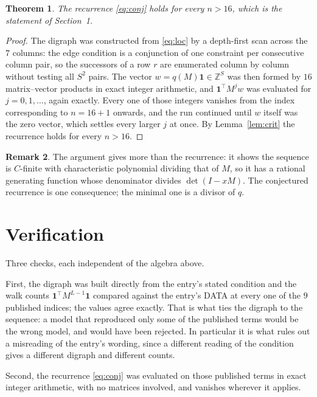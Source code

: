 \documentclass[11pt,a4paper]{article}
\theoremstyle{plain}
\newtheorem{theorem}{Theorem}
\theoremstyle{definition}
\newtheorem{remark}[theorem]{Remark}
\begin{document}
\begin{theorem}
The recurrence \eqref{eq:conj} holds for every $n>16$, which is the statement of
Section~1.
\end{theorem}

\begin{proof}
The digraph was constructed from \eqref{eq:loc} by a depth-first scan across the $7$
columns: the edge condition is a conjunction of one constraint per consecutive column
pair, so the successors of a row $r$ are enumerated column by column without testing all
$S^2$ pairs. The vector $w=q(M)\mathbf{1}\in\mathbb{Z}^{S}$ was then formed by $16$
matrix--vector products in exact integer arithmetic, and $\mathbf{1}^{\!\top}M^{j}w$ was
evaluated for $j=0,1,\dots$, again exactly. Every one of those integers vanishes from the
index corresponding to $n=16+1$ onwards, and the run continued until $w$ itself was the
zero vector, which settles every larger $j$ at once. By Lemma~\ref{lem:crit} the recurrence
holds for every $n>16$.
\end{proof}

\begin{remark}
The argument gives more than the recurrence: it shows the sequence is $C$-finite with
characteristic polynomial dividing that of $M$, so it has a rational generating function
whose denominator divides $\det(I-xM)$. The conjectured recurrence is one consequence; the
minimal one is a divisor of $q$.
\end{remark}

\section{Verification}

Three checks, each independent of the algebra above.

First, the digraph was built directly from the entry's stated condition and the walk counts
$\mathbf{1}^{\!\top}M^{L-1}\mathbf{1}$ compared against the entry's DATA at
every one of the $9$ published indices; the values agree exactly. That is what ties
the digraph to the sequence: a model that reproduced only some of the published terms would
be the wrong model, and would have been rejected. In particular it is what rules out a
misreading of the entry's wording, since a different reading of the condition gives a
different digraph and different counts.

Second, the recurrence \eqref{eq:conj} was evaluated on those published terms in exact
integer arithmetic, with no matrices involved, and vanishes wherever it applies.
\end{document}

